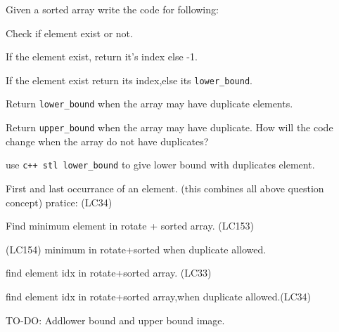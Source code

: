 \begin{exercise}
    Given a sorted array write the code for following:

   \begin{compactenum}
        \item Check if element exist or not.
        \item If the element exist, return it's index else -1.
        \item If the element exist return its index,else its \verb|lower_bound|.
        \item Return \verb|lower_bound| when the array may have duplicate elements.
        \item Return \verb|upper_bound| when the array may have duplicate. How will the code change when the array do not have duplicates?
        \item use \verb|c++ stl lower_bound| to give lower bound with duplicates element.
   \end{compactenum}

   \medskip
   \begin{compactenum}      
        \item First and last occurrance of an element. (this combines all above question concept) pratice: (LC34)
        \item Find minimum element in rotate + sorted array. (LC153)
        \item (LC154) minimum in rotate+sorted when duplicate allowed.
        \item find element idx in rotate+sorted array. (LC33)
        \item find element idx in rotate+sorted array,when duplicate allowed.(LC34)
   \end{compactenum}
\end{exercise}

TO-DO: Addlower bound and upper bound image.

